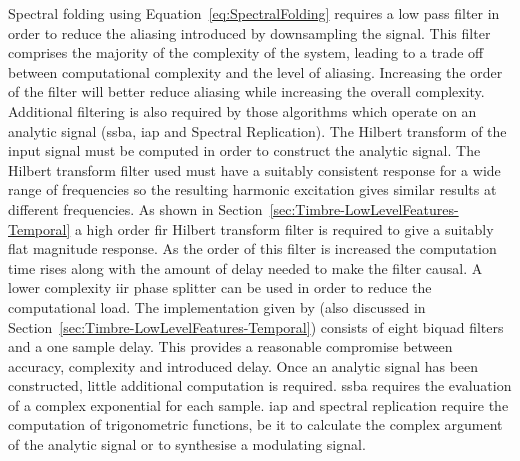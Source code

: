 		Spectral folding using Equation~\ref{eq:SpectralFolding} requires a low pass filter in order to reduce the
		aliasing introduced by downsampling the signal. This filter comprises the majority of the complexity of the
		system, leading to a trade off between computational complexity and the level of aliasing. Increasing the
		order of the filter will better reduce aliasing while increasing the overall complexity. Additional
		filtering is also required by those algorithms which operate on an analytic signal (\acrshort{ssba},
		\acrshort{iap} and Spectral Replication). The Hilbert transform of the input signal must be computed in
		order to construct the analytic signal. The Hilbert transform filter used must have a suitably consistent
		response for a wide range of frequencies so the resulting harmonic excitation gives similar results at
		different frequencies.  As shown in Section~\ref{sec:Timbre-LowLevelFeatures-Temporal} a high order
		\acrshort{fir} Hilbert transform filter is required to give a suitably flat magnitude response. As the
		order of this filter is increased the computation time rises along with the amount of delay needed to make
		the filter causal. A lower complexity \acrshort{iir} phase splitter can be used in order to reduce the
		computational load. The implementation given by \citet{niemitalo2003hilbert} (also discussed in
		Section~\ref{sec:Timbre-LowLevelFeatures-Temporal}) consists of eight biquad filters and a one sample
		delay. This provides a reasonable compromise between accuracy, complexity and introduced delay.  Once an
		analytic signal has been constructed, little additional computation is required. \acrshort{ssba} requires
		the evaluation of a complex exponential for each sample. \acrshort{iap} and spectral replication require
		the computation of trigonometric functions, be it to calculate the complex argument of the analytic signal
		or to synthesise a modulating signal.


